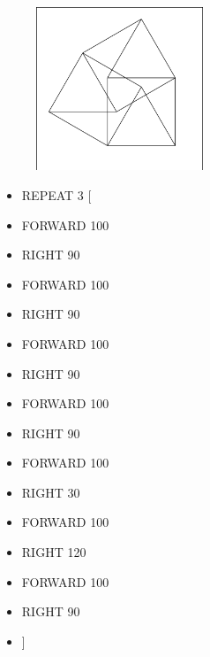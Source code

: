 \begin{minipage}{0.5\textwidth}
\begin{figure}[H]
   \includegraphics[width=5.0cm,trim=4 4 6 4,clip]{./images/marta/mar-9.png}
   \label{mar-9}
\end{figure}
\end{minipage} \hfill
\begin{minipage}{0.45\textwidth}
\begin{itemize}[itemsep=-3pt,parsep=2pt]
\item[] \hspace{0.5cm} REPEAT 3 [
\item[] \hspace{0.5cm} 	FORWARD 100
\item[] \hspace{0.5cm} 	RIGHT 90
\item[] \hspace{0.5cm} 	FORWARD 100
\item[] \hspace{0.5cm} 	RIGHT 90
\item[] \hspace{0.5cm} 	FORWARD 100
\item[] \hspace{0.5cm} 	RIGHT 90
\item[] \hspace{0.5cm} 	FORWARD 100
\item[] \hspace{0.5cm} 	RIGHT 90
\item[] \hspace{0.5cm} 	FORWARD 100
\item[] \hspace{0.5cm} 	RIGHT 30
\item[] \hspace{0.5cm} 	FORWARD 100
\item[] \hspace{0.5cm} 	RIGHT 120
\item[] \hspace{0.5cm} 	FORWARD 100
\item[] \hspace{0.5cm} 	RIGHT 90
\item[] \hspace{0.5cm} 	]          
\end{itemize}          	          
\end{minipage}

